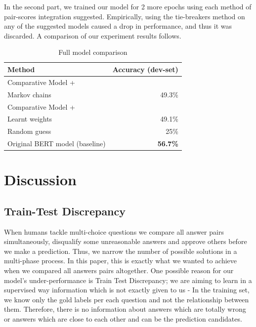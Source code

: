 \documentclass{article}
\begin{document}
In the second part, we trained our model for 2 more epochs using each method of pair-scores integration suggested. Empirically, using the tie-breakers method on any of the suggested models caused a drop in performance, and thus it was discarded.
A comparison of our experiment results follows.

\begin{table}[h!]
	\label{tbl:accuracy}
	\vskip 0.15in
	\begin{center}
		\begin{small}
			\begin{sc}
				\begin{tabular}{lr}
					\toprule
					Method	& Accuracy (dev-set)\\
					\midrule
					Comparative Model + \\ \qquad \qquad Markov chains 	& 49.3\% \\
					Comparative Model + \\ \qquad \qquad Learnt weights 	& 49.1\% \\
					\midrule
					Random guess & 25\% \\
					Original BERT model (baseline) & \textbf{56.7\%} \\
					\bottomrule
				\end{tabular}
			\end{sc}
		\end{small}
	\end{center}
	\vskip -0.1in
	\caption{Full model comparison}
\end{table}

\section{Discussion}
\subsection{Train-Test Discrepancy}
When humans tackle multi-choice questions we compare all answer pairs simultaneously, disqualify some unreasonable answers and approve others before we make a prediction. Thus, we narrow the number of possible solutions in a multi-phase process. In this paper, this is exactly what we wanted to achieve when we compared all answers pairs altogether. One possible reason for our model's under-performance is Train Test Discrepancy; we are aiming to learn in a supervised way information which is not exactly given to us - In the training set, we know only the gold labels per each question and not the relationship between them. Therefore, there is no information about answers which are totally wrong or answers which are close to each other and can be the prediction candidates. 
\end{document}
